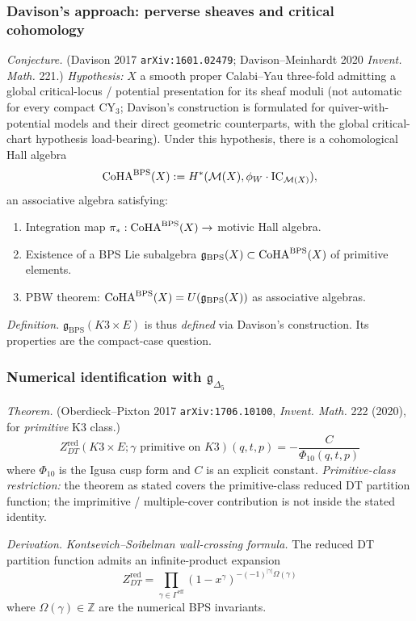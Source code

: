 \subsubsection{Davison's approach: perverse sheaves and critical cohomology}

\emph{Conjecture.} (Davison 2017 \texttt{arXiv:1601.02479};
Davison--Meinhardt 2020 \emph{Invent. Math.} 221.) \emph{Hypothesis:}
$X$ a smooth proper Calabi--Yau three-fold admitting a global critical-locus /
potential presentation for its sheaf moduli (not automatic for every compact CY$_3$;
Davison's construction is formulated for quiver-with-potential models and their direct
geometric counterparts, with the global critical-chart hypothesis load-bearing).
Under this hypothesis, there is a cohomological Hall algebra
\[
\mathrm{CoHA}^{\mathrm{BPS}}(X) := H^*(\mathcal{M}(X), \phi_W \cdot \mathrm{IC}_{\mathcal{M}(X)}),
\]
an associative algebra satisfying:
\begin{enumerate}
\item Integration map $\pi_*: \mathrm{CoHA}^{\mathrm{BPS}}(X) \to $ motivic Hall algebra.
\item Existence of a BPS Lie subalgebra $\mathfrak{g}_{\mathrm{BPS}}(X) \subset \mathrm{CoHA}^{\mathrm{BPS}}(X)$
of primitive elements.
\item PBW theorem: $\mathrm{CoHA}^{\mathrm{BPS}}(X) = U(\mathfrak{g}_{\mathrm{BPS}}(X))$ as
associative algebras.
\end{enumerate}

\emph{Definition.} $\mathfrak{g}_{\mathrm{BPS}}(K3 \times E)$ is thus \emph{defined}
via Davison's construction. Its properties are the compact-case question.

\subsubsection{Numerical identification with $\mathfrak{g}_{\Delta_5}$}

\emph{Theorem.} (Oberdieck--Pixton 2017 \texttt{arXiv:1706.10100},
\emph{Invent. Math.} 222 (2020), for \emph{primitive} K3 class.)
\[
Z^{\mathrm{red}}_{DT}(K3 \times E; \gamma \text{ primitive on } K3)(q, t, p)
= - \frac{C}{\Phi_{10}(q, t, p)}
\]
where $\Phi_{10}$ is the Igusa cusp form and $C$ is an explicit constant.
\emph{Primitive-class restriction:} the theorem as stated covers the primitive-class reduced DT
partition function; the imprimitive / multiple-cover contribution is not inside the
stated identity.

\emph{Derivation.} \emph{Kontsevich--Soibelman wall-crossing formula.}
The reduced DT partition function admits an infinite-product expansion
\[
Z^{\mathrm{red}}_{DT} = \prod_{\gamma \in \Gamma^{\mathrm{eff}}}
(1 - x^\gamma)^{- (-1)^{|\gamma|}\Omega(\gamma)}
\]
where $\Omega(\gamma) \in \mathbb{Z}$ are the numerical BPS invariants.

